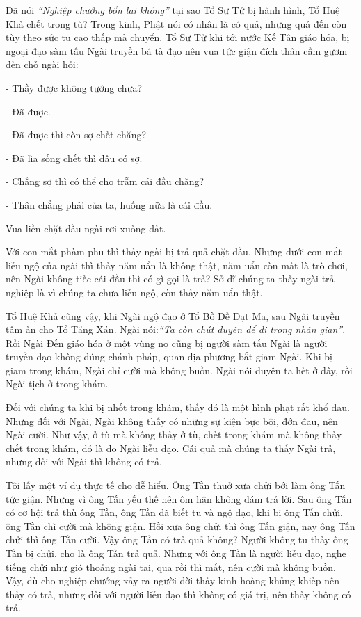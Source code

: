 \documentclass[
  12pt,
  oneside]{book}
\begin{document}
Đã nói \emph{``Nghiệp chướng bổn lai không''} tại sao Tổ Sư Tử bị hành hình, Tổ Huệ Khả chết trong tù? Trong kinh, Phật nói có nhân là có quả, nhưng quả đến còn tùy theo sức tu cao thấp mà chuyển. Tổ Sư Tử khi tới nước Kế Tân giáo hóa, bị ngoại đạo sàm tấu Ngài truyền bá tà đạo nên vua tức giận đích thân cầm gươm đến chỗ ngài hỏi:

- Thầy được không tướng chưa?

- Đã được.

- Đã được thì còn sợ chết chăng?

- Đã lìa sống chết thì đâu có sợ.

- Chẳng sợ thì có thể cho trẫm cái đầu chăng?

- Thân chẳng phải của ta, huống nữa là cái đầu.

Vua liền chặt đầu ngài rơi xuống đất.

Với con mắt phàm phu thì thấy ngài bị trả quả chặt đầu. Nhưng dưới con mắt liễu ngộ của ngài thì thấy năm uẩn là không thật, năm uẩn còn mất là trò chơi, nên Ngài không tiếc cái đầu thì có gì gọi là trả? Sở dĩ chúng ta thấy ngài trả nghiệp là vì chúng ta chưa liễu ngộ, còn thấy năm uẩn thật.

Tổ Huệ Khả cũng vậy, khi Ngài ngộ đạo ở Tổ Bồ Đề Đạt Ma, sau Ngài truyền tâm ấn cho Tổ Tăng Xán. Ngài nói:\emph{``Ta còn chút duyên để đi trong nhân gian''}. Rồi Ngài Đến giáo hóa ở một vùng nọ cũng bị người sàm tấu Ngài là người truyền đạo không đúng chánh pháp, quan địa phương bắt giam Ngài. Khi bị giam trong khám, Ngài chỉ cười mà không buồn. Ngài nói duyên ta hết ở đây, rồi Ngài tịch ở trong khám.

Đối với chúng ta khi bị nhốt trong khám, thấy đó là một hình phạt rất khổ đau. Nhưng đối với Ngài, Ngài không thấy có những sự kiện bực bội, đớn đau, nên Ngài cười. Như vậy, ở tù mà không thấy ở tù, chết trong khám mà không thấy chết trong khám, đó là do Ngài liễu đạo. Cái quả mà chúng ta thấy Ngài trả, nhưng đối với Ngài thì không có trả.

Tôi lấy một ví dụ thực tế cho dễ hiểu. Ông Tần thuở xưa chửi bới làm ông Tấn tức giận. Nhưng vì ông Tấn yếu thế nên ôm hận không dám trả lời. Sau ông Tấn có cơ hội trả thù ông Tần, ông Tần đã biết tu và ngộ đạo, khi bị ông Tấn chửi, ông Tần chì cười mà không giận. Hồi xưa ông chửi thì ông Tấn giận, nay ông Tấn chửi thì ông Tần cười. Vậy ông Tần có trả quả không? Người không tu thấy ông Tần bị chửi, cho là ông Tần trả quả. Nhưng với ông Tần là người liễu đạo, nghe tiếng chửi như gió thoảng ngài tai, qua rồi thì mất, nên cười mà không buồn. Vậy, dù cho nghiệp chướng xảy ra người đời thấy kinh hoàng khủng khiếp nên thấy có trả, nhưng đối với người liễu đạo thì không có giá trị, nên thấy không có trả.
\end{document}
